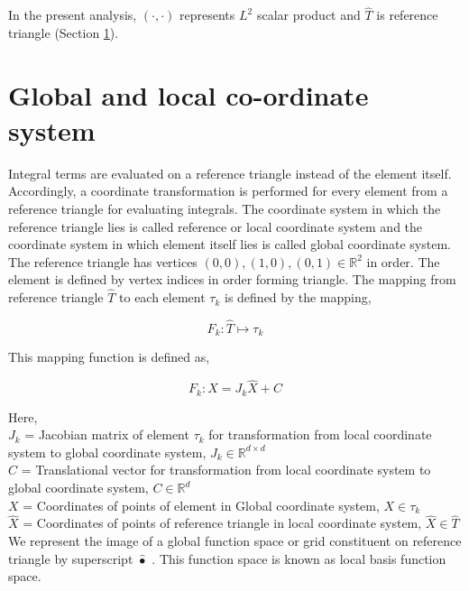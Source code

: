 \documentclass[a4paper,12pt]{book}
\begin{document}
In the present analysis, $(\cdot,\cdot)$ represents $L^2$ scalar product and $\hat{T}$ is reference triangle (Section \ref{section_glob_loc}). 

\section{Global and local co-ordinate system} \label{section_glob_loc}

Integral terms are evaluated on a reference triangle instead of the element itself. Accordingly, a coordinate transformation is performed for every element from a reference triangle for evaluating integrals. The coordinate system in which the reference triangle lies is called reference or local coordinate system and the coordinate system in which element itself lies is called global coordinate system. The reference triangle has vertices $(0,0),(1,0),(0,1) \in \mathbb{R}^2$ in order. The element is defined by vertex indices in order forming triangle. The mapping from reference triangle $\hat{T}$ to each element $\tau_k$ is defined by the mapping,

\begin{equation}\label{local global mapping}
F_k:\hat{T} \mapsto \tau_k
\end{equation}

This mapping function is defined as,

\begin{equation}\label{local global mapping equation}
F_k: X = J_k \hat{X} + C
\end{equation}

Here,
\\
$J_k$ = Jacobian matrix of element $\tau_k$ for transformation from local coordinate system to global coordinate system, $J_k \in \mathbb{R}^{d \times d}$\\
$C$ = Translational vector for transformation from local coordinate system to global coordinate system, $C \in \mathbb{R}^d$\\
$X$ = Coordinates of points of element in Global coordinate system, $X \in \tau_k$ \\
$\hat{X}$ = Coordinates of points of reference triangle in local coordinate system, $\hat{X} \in \hat{T}$\\

We represent the image of a global function space or grid constituent on reference triangle by superscript $\hat{•}$ . This function space is known as local basis function space. 
\end{document}
